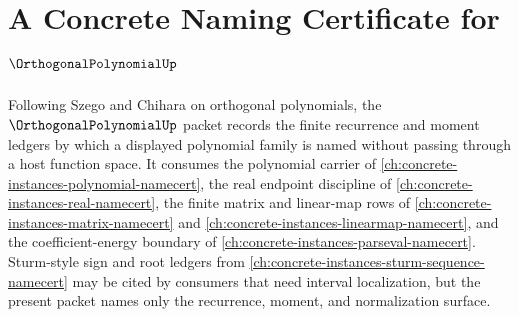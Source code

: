\chapter{A Concrete Naming Certificate for $\OrthogonalPolynomialUp$}
\label{ch:concrete-instances-orthogonal-polynomial-namecert}

Following Szego and Chihara on orthogonal polynomials, the $\OrthogonalPolynomialUp$ packet records the finite recurrence and moment ledgers by which a displayed polynomial family is named without passing through a host function space. It consumes the polynomial carrier of \autoref{ch:concrete-instances-polynomial-namecert}, the real endpoint discipline of \autoref{ch:concrete-instances-real-namecert}, the finite matrix and linear-map rows of \autoref{ch:concrete-instances-matrix-namecert} and \autoref{ch:concrete-instances-linearmap-namecert}, and the coefficient-energy boundary of \autoref{ch:concrete-instances-parseval-namecert}. Sturm-style sign and root ledgers from \autoref{ch:concrete-instances-sturm-sequence-namecert} may be cited by consumers that need interval localization, but the present packet names only the recurrence, moment, and normalization surface.

